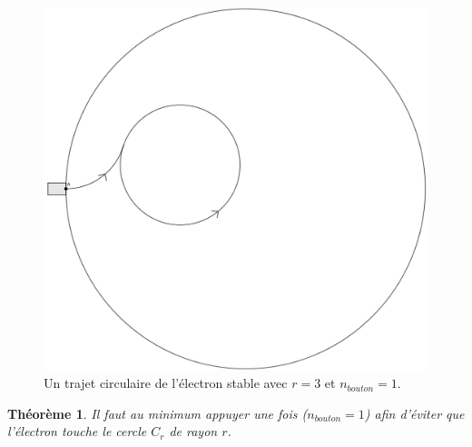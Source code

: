 \documentclass{amsart}
\newtheorem{theorem}{Théorème}[section]
\theoremstyle{definition}
\theoremstyle{remark}
\numberwithin{equation}{section}
\begin{document}
\begin{figure}[H]
  \centering
  \includegraphics[scale=0.15]{images/inside_circle.png}
  \caption{Un trajet circulaire de l'électron stable avec $r=3$ et $n_{bouton}=1$.}
\end{figure}

\begin{theorem}
  Il faut au minimum appuyer une fois ($n_{bouton}=1$) afin d'éviter que l'électron touche le cercle $C_r$ de rayon $r$.
\end{theorem}
\end{document}
